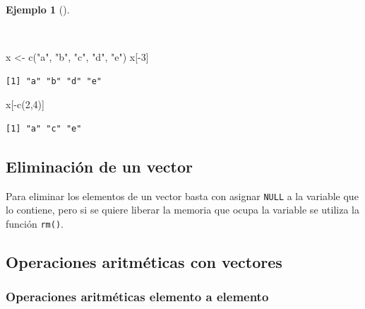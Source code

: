 \documentclass[
  a4paper,
]{scrreport}
\newenvironment{Shaded}{\begin{snugshade}}{\end{snugshade}}
\newcommand{\DecValTok}[1]{\textcolor[rgb]{0.68,0.00,0.00}{#1}}
\newcommand{\FunctionTok}[1]{\textcolor[rgb]{0.28,0.35,0.67}{#1}}
\newcommand{\NormalTok}[1]{\textcolor[rgb]{0.00,0.23,0.31}{#1}}
\newcommand{\OtherTok}[1]{\textcolor[rgb]{0.00,0.23,0.31}{#1}}
\newcommand{\SpecialCharTok}[1]{\textcolor[rgb]{0.37,0.37,0.37}{#1}}
\newcommand{\StringTok}[1]{\textcolor[rgb]{0.13,0.47,0.30}{#1}}
\theoremstyle{definition}
\theoremstyle{definition}
\newtheorem{example}{Ejemplo}[chapter]
\theoremstyle{remark}
\begin{document}
\begin{example}[]\protect\hypertarget{exm-eliminar-elementos-vector}{}\label{exm-eliminar-elementos-vector}

~

\begin{Shaded}
\begin{Highlighting}[]
\NormalTok{x }\OtherTok{\textless{}{-}} \FunctionTok{c}\NormalTok{(}\StringTok{"a"}\NormalTok{, }\StringTok{"b"}\NormalTok{, }\StringTok{"c"}\NormalTok{, }\StringTok{"d"}\NormalTok{, }\StringTok{"e"}\NormalTok{)}
\NormalTok{x[}\SpecialCharTok{{-}}\DecValTok{3}\NormalTok{]}
\end{Highlighting}
\end{Shaded}

\begin{verbatim}
[1] "a" "b" "d" "e"
\end{verbatim}

\begin{Shaded}
\begin{Highlighting}[]
\NormalTok{x[}\SpecialCharTok{{-}}\FunctionTok{c}\NormalTok{(}\DecValTok{2}\NormalTok{,}\DecValTok{4}\NormalTok{)]}
\end{Highlighting}
\end{Shaded}

\begin{verbatim}
[1] "a" "c" "e"
\end{verbatim}

\end{example}

\hypertarget{eliminaciuxf3n-de-un-vector}{%
\subsection{Eliminación de un
vector}\label{eliminaciuxf3n-de-un-vector}}

Para eliminar los elementos de un vector basta con asignar \texttt{NULL}
a la variable que lo contiene, pero si se quiere liberar la memoria que
ocupa la variable se utiliza la función \texttt{rm()}.

\hypertarget{operaciones-aritmuxe9ticas-con-vectores}{%
\subsection{Operaciones aritméticas con
vectores}\label{operaciones-aritmuxe9ticas-con-vectores}}

\hypertarget{operaciones-aritmuxe9ticas-elemento-a-elemento}{%
\subsubsection{Operaciones aritméticas elemento a
elemento}\label{operaciones-aritmuxe9ticas-elemento-a-elemento}}
\end{document}

